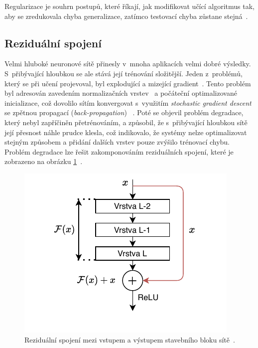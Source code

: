 
Regularizace je souhrn postupů, které říkají, jak modifikovat učící algoritmus tak, aby se zredukovala chyba generalizace, zatímco testovací chyba zůstane stejná~\cite{mitdeeplearning}.


\subsection{Reziduální spojení}
Velmi hluboké neuronové sítě přinesly v~mnoha aplikacích velmi dobré výsledky. S~přibývající hloubkou se ale stává její trénování složitější. Jeden z~problémů, který se při učení projevoval, byl explodující a mizející gradient~\cite{279181}. Tento problém byl adresován zavedením normalizačních vrstev~\cite{ioffe2015batch} a počáteční optimalizované inicializace, což dovolilo sítím konvergovat s~využitím \textit{stochastic gradient descent} se zpětnou propagací (\textit{back-propagation})~ \cite{6795724}. Poté se objevil problém degradace, který nebyl zapříčiněn přetrénováním, a způsobil, že s~přibývající hloubkou sítě její přesnost náhle prudce klesla, což indikovalo, že systémy nelze optimalizovat stejným způsobem a přidání dalších vrstev pouze zvýšilo trénovací chybu. Problém degradace lze řešit zakomponováním reziduálních spojení, které je zobrazeno na obrázku \ref{fig:residualconnection}~\cite{he2015deep}.

\begin{figure}[H]
    \centering
    \includegraphics[scale=1.15]{obrazky-figures/residual_connection.pdf}
    \caption{\label{fig:residualconnection}Reziduální spojení mezi vstupem a výstupem stavebního bloku sítě~\cite{he2015deep}.}
\end{figure}

